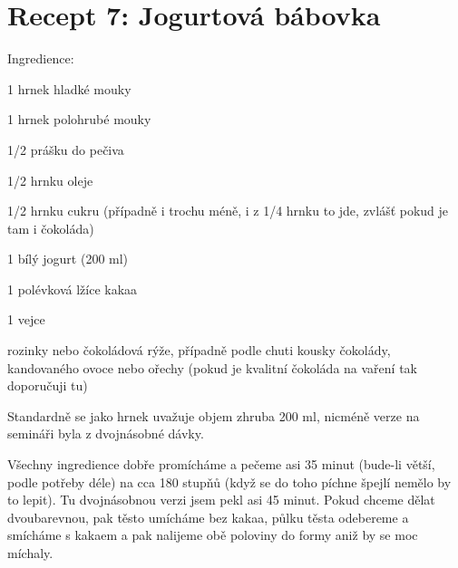 \documentclass[12pt]{article}
\begin{document}
\section*{Recept 7: Jogurtová bábovka}

Ingredience:
\begin{compactitem}
    \item 1 hrnek hladké mouky
    \item 1  hrnek polohrubé mouky
    \item 1/2 prášku do pečiva
    \item 1/2 hrnku oleje
    \item 1/2 hrnku cukru (případně i trochu méně, i z 1/4 hrnku to jde, zvlášť pokud je tam i čokoláda)
    \item 1 bílý jogurt (200 ml)
    \item 1 polévková lžíce kakaa
    \item 1 vejce
    \item rozinky nebo čokoládová rýže, případně podle chuti kousky čokolády, kandovaného ovoce nebo ořechy
        (pokud je kvalitní čokoláda na vaření tak doporučuji tu)
\end{compactitem}

\bigskip\noindent
Standardně se jako hrnek uvažuje objem zhruba 200 ml, nicméně verze na semináři
byla z dvojnásobné dávky.

Všechny ingredience dobře promícháme a pečeme asi 35 minut
(bude-li větší, podle potřeby déle) na cca 180 stupňů (když se do toho píchne špejlí
nemělo by to lepit). Tu dvojnásobnou verzi jsem pekl asi 45 minut. Pokud chceme dělat
dvoubarevnou, pak těsto umícháme bez kakaa, půlku těsta odebereme a smícháme s kakaem
a pak nalijeme obě poloviny do formy aniž by se moc míchaly.
\end{document}
